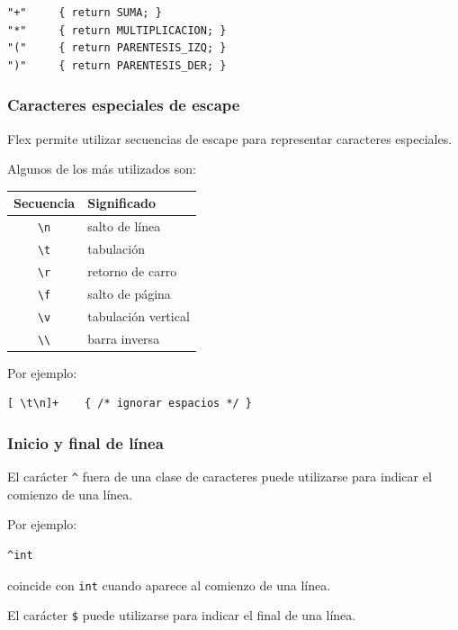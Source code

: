 \documentclass{article}
\begin{document}
\begin{verbatim}
"+"     { return SUMA; }
"*"     { return MULTIPLICACION; }
"("     { return PARENTESIS_IZQ; }
")"     { return PARENTESIS_DER; }
\end{verbatim}

\subsubsection{Caracteres especiales de escape}

Flex permite utilizar secuencias de escape para representar caracteres
especiales.

Algunos de los más utilizados son:

\begin{center}
\begin{tabular}{c|l}
\textbf{Secuencia} & \textbf{Significado} \\
\hline
\texttt{\textbackslash n} & salto de línea \\
\texttt{\textbackslash t} & tabulación \\
\texttt{\textbackslash r} & retorno de carro \\
\texttt{\textbackslash f} & salto de página \\
\texttt{\textbackslash v} & tabulación vertical \\
\texttt{\textbackslash \textbackslash} & barra inversa \\
\end{tabular}
\end{center}

Por ejemplo:

\begin{verbatim}
[ \t\n]+    { /* ignorar espacios */ }
\end{verbatim}

\subsubsection{Inicio y final de línea}

El carácter \texttt{\^} fuera de una clase de caracteres puede utilizarse
para indicar el comienzo de una línea.

Por ejemplo:

\begin{verbatim}
^int
\end{verbatim}

coincide con \texttt{int} cuando aparece al comienzo de una línea.

El carácter \texttt{\$} puede utilizarse para indicar el final de una
línea.
\end{document}
